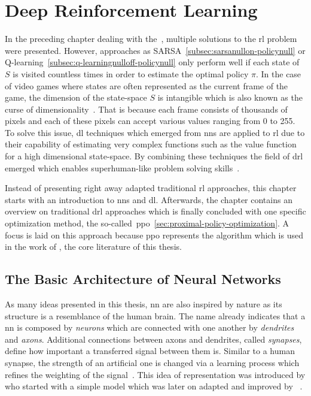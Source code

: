 \documentclass[draft,final]{vutinfth} %
\newcommand{\p}[1]{see p. #1}
\begin{document}
    \chapter{Deep Reinforcement Learning}\label{ch:deep-reinforcement-learning}


    In the preceding chapter dealing with the~, multiple solutions to the \gls{rl} problem were presented.
    However, approaches as SARSA~\eqref{subsec:sarsanullon-policynull} or Q-learning~\eqref{subsec:q-learningnulloff-policynull} only perform well if each state of $\mathit{S}$ is visited countless times in order to estimate the optimal policy $\pi$.
    In the case of video games where states are often represented as the current frame of the game, the dimension of the state-space $\mathit{S}$ is intangible which is also known as the curse of dimensionality~\citep{goodfellow_deep_2016}.
    That is because each frame consists of thousands of pixels and each of these pixels can accept various values ranging from 0 to 255.
    To solve this issue, \gls{dl} techniques which emerged from \glspl{nn} are applied to \gls{rl} due to their capability of estimating very complex functions such as the value function for a high dimensional state-space.
    By combining these techniques the field of \gls{drl} emerged which enables superhuman-like problem solving skills~\citep{francois-lavet_introduction_2018}.

    Instead of presenting right away adapted traditional \gls{rl} approaches, this chapter starts with an introduction to \glspl{nn} and \gls{dl}.
    Afterwards, the chapter contains an overview on traditional \gls{drl} approaches which is finally concluded with one specific optimization method, the so-called~\gls{ppo}~\eqref{sec:proximal-policy-optimization}.
    A focus is laid on this approach because \gls{ppo} represents the algorithm which is used in the work of \citeauthor{burda_large-scale_2018-1}, the core literature of this thesis.


    \section{The Basic Architecture of Neural Networks}\label{subsec:the-basic-architecture-of-neural-networks}


    As many ideas presented in this thesis, \gls{nn} are also inspired by nature as its structure is a resemblance of the human brain.
    The name already indicates that a \gls{nn} is composed by \textit{neurons} which are connected with one another by \textit{dendrites} and \textit{axons}.
    Additional connections between axons and dendrites, called \textit{synapses}, define how important a transferred signal between them is.
    Similar to a human synapse, the strength of an artificial one is changed via a learning process which refines the weighting of the signal~\citep{aggarwal_neural_2018}.
    This idea of representation was introduced by \citeauthor{mcculloch_logical_1943} who started with a simple model which was later on adapted and improved by \citeauthor{rosenblatt_perceptron_1957}~\citep[\p{167}]{awad_deep_2015}.
\end{document}
